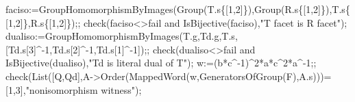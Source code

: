 \documentclass[
  10pt,
  letterpaper,
]{article}
\newenvironment{Shaded}{}{}
\newcommand{\BuiltInTok}[1]{\textcolor[rgb]{0.00,0.50,0.00}{#1}}
\newcommand{\ConstantTok}[1]{\textcolor[rgb]{0.53,0.00,0.00}{#1}}
\newcommand{\FloatTok}[1]{\textcolor[rgb]{0.25,0.63,0.44}{#1}}
\newcommand{\NormalTok}[1]{#1}
\newcommand{\OperatorTok}[1]{\textcolor[rgb]{0.40,0.40,0.40}{#1}}
\newcommand{\StringTok}[1]{\textcolor[rgb]{0.25,0.44,0.63}{#1}}
\newcommand{\VariableTok}[1]{\textcolor[rgb]{0.10,0.09,0.49}{#1}}
\begin{document}
\begin{Shaded}
\begin{Highlighting}[]
\VariableTok{faciso}\OperatorTok{:=}\BuiltInTok{GroupHomomorphismByImages}\NormalTok{(}\BuiltInTok{Group}\NormalTok{(}\VariableTok{T}\NormalTok{.}\VariableTok{s}\NormalTok{\{[}\FloatTok{1}\OperatorTok{,}\FloatTok{2}\NormalTok{]\})}\OperatorTok{,}\BuiltInTok{Group}\NormalTok{(}\VariableTok{R}\NormalTok{.}\VariableTok{s}\NormalTok{\{[}\FloatTok{1}\OperatorTok{,}\FloatTok{2}\NormalTok{]\})}\OperatorTok{,}\VariableTok{T}\NormalTok{.}\VariableTok{s}\NormalTok{\{[}\FloatTok{1}\OperatorTok{,}\FloatTok{2}\NormalTok{]\}}\OperatorTok{,}\VariableTok{R}\NormalTok{.}\VariableTok{s}\NormalTok{\{[}\FloatTok{1}\OperatorTok{,}\FloatTok{2}\NormalTok{]\})}\OperatorTok{;;}
\VariableTok{check}\NormalTok{(}\VariableTok{faciso}\OperatorTok{\textless{}\textgreater{}}\ConstantTok{fail} \ConstantTok{and} \BuiltInTok{IsBijective}\NormalTok{(}\VariableTok{faciso}\NormalTok{)}\OperatorTok{,}\StringTok{"T facet is R facet"}\NormalTok{)}\OperatorTok{;}
\VariableTok{dualiso}\OperatorTok{:=}\BuiltInTok{GroupHomomorphismByImages}\NormalTok{(}\VariableTok{T}\NormalTok{.}\VariableTok{g}\OperatorTok{,}\VariableTok{Td}\NormalTok{.}\VariableTok{g}\OperatorTok{,}\VariableTok{T}\NormalTok{.}\VariableTok{s}\OperatorTok{,}\NormalTok{[}\VariableTok{Td}\NormalTok{.}\VariableTok{s}\NormalTok{[}\FloatTok{3}\NormalTok{]}\OperatorTok{\^{}{-}}\FloatTok{1}\OperatorTok{,}\VariableTok{Td}\NormalTok{.}\VariableTok{s}\NormalTok{[}\FloatTok{2}\NormalTok{]}\OperatorTok{\^{}{-}}\FloatTok{1}\OperatorTok{,}\VariableTok{Td}\NormalTok{.}\VariableTok{s}\NormalTok{[}\FloatTok{1}\NormalTok{]}\OperatorTok{\^{}{-}}\FloatTok{1}\NormalTok{])}\OperatorTok{;;}
\VariableTok{check}\NormalTok{(}\VariableTok{dualiso}\OperatorTok{\textless{}\textgreater{}}\ConstantTok{fail} \ConstantTok{and} \BuiltInTok{IsBijective}\NormalTok{(}\VariableTok{dualiso}\NormalTok{)}\OperatorTok{,}\StringTok{"Td is literal dual of T"}\NormalTok{)}\OperatorTok{;}
\VariableTok{w}\OperatorTok{:=}\NormalTok{(}\VariableTok{b}\OperatorTok{*}\VariableTok{c}\OperatorTok{\^{}{-}}\FloatTok{1}\NormalTok{)}\OperatorTok{\^{}}\FloatTok{2}\OperatorTok{*}\VariableTok{a}\OperatorTok{*}\VariableTok{c}\OperatorTok{\^{}}\FloatTok{2}\OperatorTok{*}\VariableTok{a}\OperatorTok{\^{}{-}}\FloatTok{1}\OperatorTok{;;}
\VariableTok{check}\NormalTok{(}\BuiltInTok{List}\NormalTok{([}\VariableTok{Q}\OperatorTok{,}\VariableTok{Qd}\NormalTok{]}\OperatorTok{,}\VariableTok{A}\OperatorTok{{-}\textgreater{}}\BuiltInTok{Order}\NormalTok{(}\BuiltInTok{MappedWord}\NormalTok{(}\VariableTok{w}\OperatorTok{,}\BuiltInTok{GeneratorsOfGroup}\NormalTok{(}\VariableTok{F}\NormalTok{)}\OperatorTok{,}\VariableTok{A}\NormalTok{.}\VariableTok{s}\NormalTok{)))}\OperatorTok{=}\NormalTok{[}\FloatTok{1}\OperatorTok{,}\FloatTok{3}\NormalTok{]}\OperatorTok{,}\StringTok{"nonisomorphism witness"}\NormalTok{)}\OperatorTok{;}

\end{Highlighting}
\end{Shaded}
\end{document}
